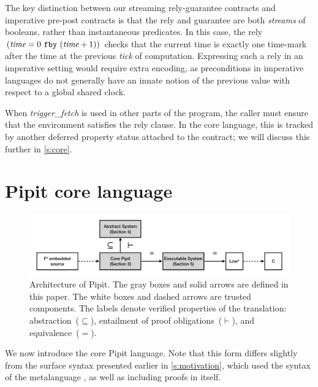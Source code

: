\documentclass[a4paper,UKenglish,cleveref, autoref, thm-restate,anonymous]{lipics-v2021}
\begin{document}
The key distinction between our streaming rely-guarantee contracts and imperative pre-post contracts is that the rely and guarantee are both \emph{streams} of booleans, rather than instantaneous predicates.
In this case, the rely $(\textit{time} = 0~\texttt{fby}~(\textit{time} + 1))$ checks that the current time is exactly one time-mark after the time at the previous \emph{tick} of computation.
Expressing such a rely in an imperative setting would require extra encoding, as preconditions in imperative languages do not generally have an innate notion of the previous value with respect to a global shared clock.

When \emph{trigger_fetch} is used in other parts of the program, the caller must ensure that the environment satisfies the rely clause.
In the core language, this is tracked by another deferred property status attached to the contract; we will discuss this further in \autoref{s:core}.
 

\section{Pipit core language}
\label{s:core}

\begin{figure}
  \includegraphics[width=\textwidth]{figures/core-structure-1920x450.pdf}
\caption{Architecture of Pipit. The gray boxes and solid arrows are defined in this paper. The white boxes and dashed arrows are trusted components. The labels denote verified properties of the translation: abstraction~($\subseteq$), entailment of proof obligations~($\vdash$), and equivalence~($=$).
}
\label{f:core:structure}
\end{figure}
 
We now introduce the core Pipit language.
Note that this form differs slightly from the surface syntax presented earlier in \autoref{s:motivation}, which used the syntax of the metalanguage \fstar{}, as well as including proofs in \fstar{} itself.
\end{document}
